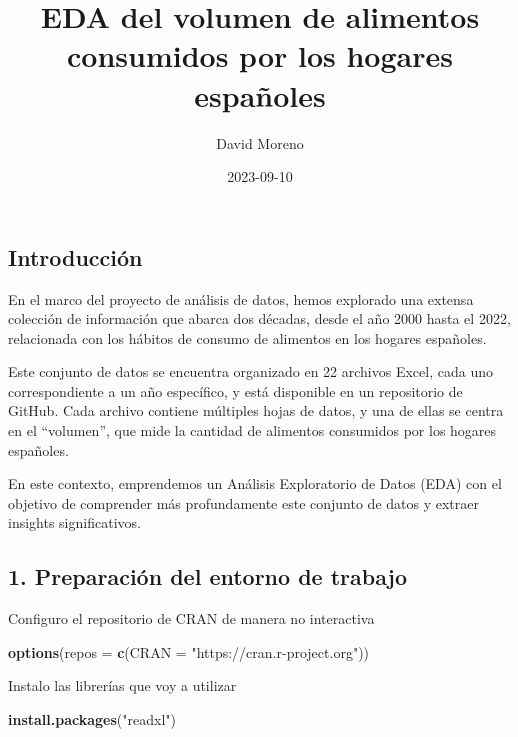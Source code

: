 \documentclass[
]{article}
\title{EDA del volumen de alimentos consumidos por los hogares
españoles}
\author{David Moreno}
\date{2023-09-10}
\newenvironment{Shaded}{\begin{snugshade}}{\end{snugshade}}
\newcommand{\AttributeTok}[1]{\textcolor[rgb]{0.13,0.29,0.53}{#1}}
\newcommand{\FunctionTok}[1]{\textcolor[rgb]{0.13,0.29,0.53}{\textbf{#1}}}
\newcommand{\NormalTok}[1]{#1}
\newcommand{\StringTok}[1]{\textcolor[rgb]{0.31,0.60,0.02}{#1}}
\begin{document}
\maketitle

\hypertarget{introducciuxf3n}{%
\subsection{Introducción}\label{introducciuxf3n}}

En el marco del proyecto de análisis de datos, hemos explorado una
extensa colección de información que abarca dos décadas, desde el año
2000 hasta el 2022, relacionada con los hábitos de consumo de alimentos
en los hogares españoles.

Este conjunto de datos se encuentra organizado en 22 archivos Excel,
cada uno correspondiente a un año específico, y está disponible en un
repositorio de GitHub. Cada archivo contiene múltiples hojas de datos, y
una de ellas se centra en el ``volumen'', que mide la cantidad de
alimentos consumidos por los hogares españoles.

En este contexto, emprendemos un Análisis Exploratorio de Datos (EDA)
con el objetivo de comprender más profundamente este conjunto de datos y
extraer insights significativos.

\hypertarget{preparaciuxf3n-del-entorno-de-trabajo}{%
\subsection{1. Preparación del entorno de
trabajo}\label{preparaciuxf3n-del-entorno-de-trabajo}}

Configuro el repositorio de CRAN de manera no interactiva

\begin{Shaded}
\begin{Highlighting}[]
\FunctionTok{options}\NormalTok{(}\AttributeTok{repos =} \FunctionTok{c}\NormalTok{(}\AttributeTok{CRAN =} \StringTok{"https://cran.r{-}project.org"}\NormalTok{))}
\end{Highlighting}
\end{Shaded}

Instalo las librerías que voy a utilizar

\begin{Shaded}
\begin{Highlighting}[]
\FunctionTok{install.packages}\NormalTok{(}\StringTok{"readxl"}\NormalTok{)}
\end{Highlighting}
\end{Shaded}
\end{document}
